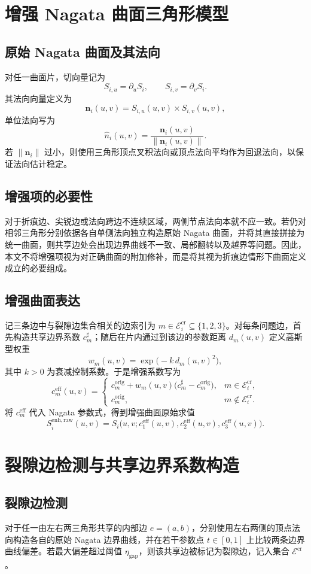 \documentclass[12pt,oneside]{ctexbook}
\begin{document}
\section{增强 Nagata 曲面三角形模型}
\subsection{原始 Nagata 曲面及其法向}
对任一曲面片，切向量记为
\[
S_{i,u}=\partial_u S_i,\qquad S_{i,v}=\partial_v S_i.
\]
其法向向量定义为
\[
\mathbf n_i(u,v)=S_{i,u}(u,v)\times S_{i,v}(u,v),
\]
单位法向写为
\[
\hat n_i(u,v)=\frac{\mathbf n_i(u,v)}{\|\mathbf n_i(u,v)\|}.
\]
若 $\|\mathbf n_i\|$ 过小，则使用三角形顶点叉积法向或顶点法向平均作为回退法向，以保证法向估计稳定。

\subsection{增强项的必要性}
对于折痕边、尖锐边或法向跨边不连续区域，两侧节点法向本就不应一致。若仍对相邻三角形分别依据各自单侧法向独立构造原始 Nagata 曲面，并将其直接拼接为统一曲面，则共享边处会出现边界曲线不一致、局部翻转以及越界等问题。因此，本文不将增强项视为对正确曲面的附加修补，而是将其视为折痕边情形下曲面定义成立的必要组成。

\subsection{增强曲面表达}
记三条边中与裂隙边集合相关的边索引为 $m\in\mathcal E_i^{\mathrm{cr}}\subseteq\{1,2,3\}$。对每条问题边，首先构造共享边界系数 $c_m^{\sharp}$；随后在片内通过到该边的参数距离 $d_m(u,v)$ 定义高斯型权重
\[
w_m(u,v)=\exp\big(-k\,d_m(u,v)^2\big),
\]
其中 $k>0$ 为衰减控制系数。于是增强系数写为
\[
c_m^{\mathrm{eff}}(u,v)=
\begin{cases}
c_m^{\mathrm{orig}}+w_m(u,v)\big(c_m^{\sharp}-c_m^{\mathrm{orig}}\big), & m\in\mathcal E_i^{\mathrm{cr}},\\
c_m^{\mathrm{orig}}, & m\notin\mathcal E_i^{\mathrm{cr}}.
\end{cases}
\]
将 $c_m^{\mathrm{eff}}$ 代入 Nagata 参数式，得到增强曲面原始求值
\[
S_i^{\mathrm{enh,raw}}(u,v)=S_i\big(u,v;c_1^{\mathrm{eff}}(u,v),c_2^{\mathrm{eff}}(u,v),c_3^{\mathrm{eff}}(u,v)\big).
\]

\section{裂隙边检测与共享边界系数构造}
\subsection{裂隙边检测}
对于任一由左右两三角形共享的内部边 $e=(a,b)$，分别使用左右两侧的顶点法向构造各自的原始 Nagata 边界曲线，并在若干参数点 $t\in[0,1]$ 上比较两条边界曲线偏差。若最大偏差超过阈值 $\eta_{\mathrm{gap}}$，则该共享边被标记为裂隙边，记入集合 $\mathcal E^{\mathrm{cr}}$。
\end{document}
